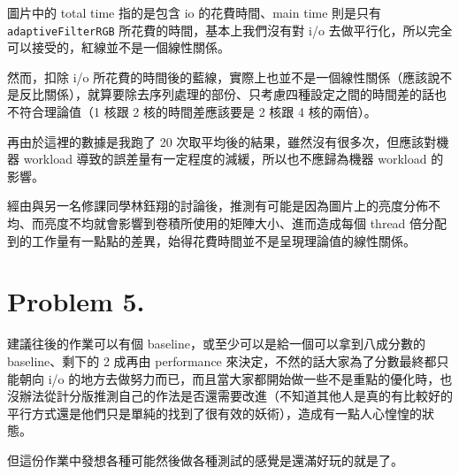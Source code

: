 \documentclass[12pt, a4paper]{article}
\begin{document}
圖片中的 total time 指的是包含 io 的花費時間、main time 則是只有 \lstinline{adaptiveFilterRGB} 所花費的時間，基本上我們沒有對 i/o 去做平行化，所以完全可以接受的，紅線並不是一個線性關係。

然而，扣除 i/o 所花費的時間後的藍線，實際上也並不是一個線性關係（應該說不是反比關係），就算要除去序列處理的部份、只考慮四種設定之間的時間差的話也不符合理論值（1 核跟 2 核的時間差應該要是 2 核跟 4 核的兩倍）。

再由於這裡的數據是我跑了 20 次取平均後的結果，雖然沒有很多次，但應該對機器 workload 導致的誤差量有一定程度的減緩，所以也不應歸為機器 workload 的影響。

經由與另一名修課同學林鈺翔的討論後，推測有可能是因為圖片上的亮度分佈不均、而亮度不均就會影響到卷積所使用的矩陣大小、進而造成每個 thread 倍分配到的工作量有一點點的差異，始得花費時間並不是呈現理論值的線性關係。
\section*{Problem 5.}
建議往後的作業可以有個 baseline，或至少可以是給一個可以拿到八成分數的 baseline、剩下的 2 成再由 performance 來決定，不然的話大家為了分數最終都只能朝向 i/o 的地方去做努力而已，而且當大家都開始做一些不是重點的優化時，也沒辦法從計分版推測自己的作法是否還需要改進（不知道其他人是真的有比較好的平行方式還是他們只是單純的找到了很有效的妖術），造成有一點人心惶惶的狀態。

但這份作業中發想各種可能然後做各種測試的感覺是還滿好玩的就是了。
\end{document}
